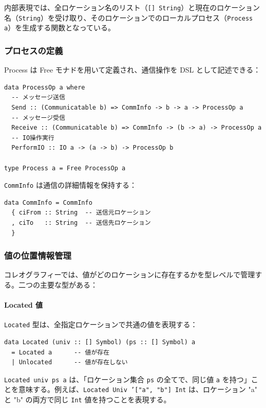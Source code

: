 内部表現では、全ロケーション名のリスト（\texttt{[] String}）と現在のロケーション名（\texttt{String}）を受け取り、そのロケーションでのローカルプロセス（\texttt{Process a}）を生成する関数となっている。

\subsubsection{プロセスの定義}

Process は Free モナドを用いて定義され、通信操作を DSL として記述できる：

\begin{verbatim}
data ProcessOp a where
  -- メッセージ送信
  Send :: (Communicatable b) => CommInfo -> b -> a -> ProcessOp a
  -- メッセージ受信
  Receive :: (Communicatable b) => CommInfo -> (b -> a) -> ProcessOp a
  -- IO操作実行
  PerformIO :: IO a -> (a -> b) -> ProcessOp b

type Process a = Free ProcessOp a
\end{verbatim}

\texttt{CommInfo} は通信の詳細情報を保持する：
\begin{verbatim}
data CommInfo = CommInfo
  { ciFrom :: String  -- 送信元ロケーション
  , ciTo   :: String  -- 送信先ロケーション
  }
\end{verbatim}

\subsubsection{値の位置情報管理}

コレオグラフィーでは、値がどのロケーションに存在するかを型レベルで管理する。二つの主要な型がある：

\paragraph{Located 値}
\texttt{Located} 型は、全指定ロケーションで共通の値を表現する：

\begin{verbatim}
data Located (univ :: [] Symbol) (ps :: [] Symbol) a
  = Located a      -- 値が存在
  | Unlocated      -- 値が存在しない
\end{verbatim}

\texttt{Located univ ps a} は、「ロケーション集合 \texttt{ps} の全てで、同じ値 \texttt{a} を持つ」ことを意味する。例えば、\texttt{Located Univ '["a", "b"] Int} は、ロケーション "a" と "b" の両方で同じ \texttt{Int} 値を持つことを表現する。

